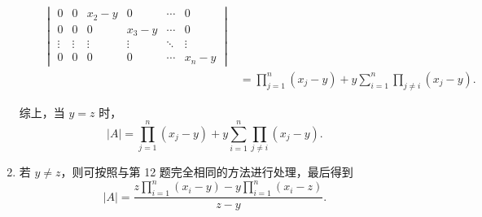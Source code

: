 \begin{exercise}
\begin{exgroup}
\begin{answer}
\begin{enumerate}
\begin{enumerate}
\begin{align*}
\begin{vmatrix}
                                        0                                & 0      & x_2-y  & 0      & \cdots & 0      \\
                                        0                                & 0      & 0      & x_3-y  & \cdots & 0      \\
                                        \vdots                           & \vdots & \vdots & \vdots & \ddots & \vdots \\
                                        0                                & 0      & 0      & 0      & \cdots & x_n-y
                                    \end{vmatrix} \\
                                    &= \prod_{j=1}^n (x_j - y) + y\sum_{i=1}^n \prod_{j \neq i} (x_j - y).
                                \end{align*}
                    \end{enumerate}
                    综上，当 $y = z$ 时，
                    \[
                        |A| = \prod_{j=1}^n (x_j - y) + y\sum_{i=1}^n \prod_{j \neq i} (x_j - y).
                    \]

                \item 若 $y \neq z$，则可按照与第 12 题完全相同的方法进行处理，最后得到
                    \[
                        |A| = \frac{z \prod_{i=1}^n (x_i - y) - y \prod_{i=1}^n (x_i - z)}{z - y}.
                    \]
            \end{enumerate}
        \end{answer}
    \end{exgroup}
\end{exercise}
